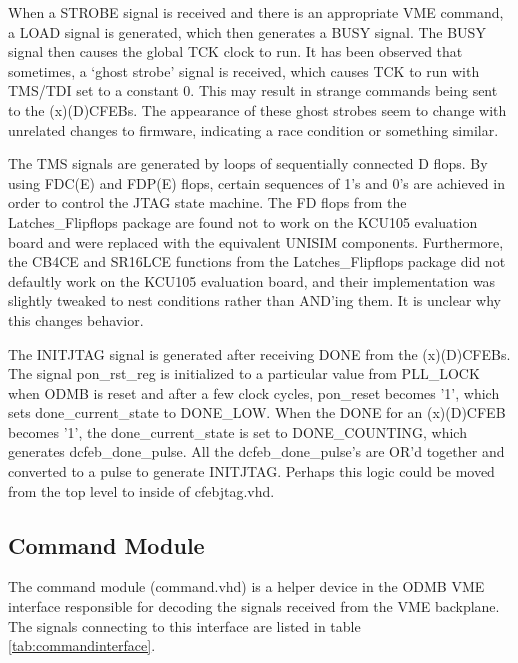 \documentclass[10pt,a4paper]{article}
\begin{document}
When a STROBE signal is received and there is an appropriate VME command, a LOAD signal is generated, which then generates a BUSY signal. The BUSY signal then causes the global TCK clock to run. It has been observed that sometimes, a `ghost strobe' signal is received, which causes TCK to run with TMS/TDI set to a constant 0. This may result in strange commands being sent to the (x)(D)CFEBs. The appearance of these ghost strobes seem to change with unrelated changes to firmware, indicating a race condition or something similar. 

The TMS signals are generated by loops of sequentially connected D flops. By using FDC(E) and FDP(E) flops, certain sequences of 1's and 0's are achieved in order to control the JTAG state machine. The FD flops from the Latches\_Flipflops package are found not to work on the KCU105 evaluation board and were replaced with the equivalent UNISIM components. Furthermore, the CB4CE and SR16LCE functions from the Latches\_Flipflops package did not defaultly work on the KCU105 evaluation board, and their implementation was slightly tweaked to nest conditions rather than AND'ing them. It is unclear why this changes behavior.

The INITJTAG signal is generated after receiving DONE from the (x)(D)CFEBs. The signal pon\_rst\_reg is initialized to a particular value from PLL\_LOCK when ODMB is reset and after a few clock cycles, pon\_reset becomes '1', which sets done\_current\_state to DONE\_LOW. When the DONE for an (x)(D)CFEB becomes '1', the done\_current\_state is set to DONE\_COUNTING, which generates dcfeb\_done\_pulse. All the dcfeb\_done\_pulse's are OR'd together and converted to a pulse to generate INITJTAG. Perhaps this logic could be moved from the top level to inside of cfebjtag.vhd.

\subsection{Command Module}

The command module (command.vhd) is a helper device in the ODMB VME interface responsible for decoding the signals received from the VME backplane. The signals connecting to this interface are listed in table \ref{tab:commandinterface}.
\end{document}
